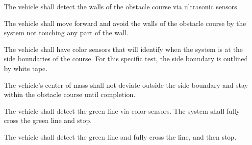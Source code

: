 \documentclass[11pt]{report}
\begin{document}
\begin{greylineformat}
\vspace{-1.6em}
\label{sub:detection-of-walls}
The vehicle shall detect the walls of the obstacle course via ultrasonic sensors.

\label{sub:avoidance-of-walls}
The vehicle shall move forward and avoid the walls of the obstacle course by the system not touching any part of the wall. 

\label{sub:detection-of-side-boundaries-of-obstacle-course-via-color-sensors}
The vehicle shall have color sensors that will identify when the system is at the side boundaries of the course. For this specific test, the side boundary is outlined by white tape.

\label{sub:stay-within-the-obstacle-course-until-course-is-complete}
The vehicle’s center of mass shall not deviate outside the side boundary and stay within the obstacle course until completion. 

\label{sub:detection-of-the-finish-line-of-obstacle-course-via-color-sensors}
The vehicle shall detect the green line via color sensors. The system shall fully cross the green line and stop.

\label{sub:system-stops-at-the-end-of-the-course}
The vehicle shall detect the green line and fully cross the line, and then stop. 
\end{greylineformat}
\end{document}
